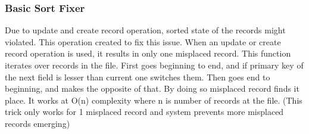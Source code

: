 \documentclass{article}
\begin{document}
\subsubsection{Basic Sort Fixer}
Due to update and create record operation, sorted state of the records might violated. This operation created to fix this issue. When an update or create record operation is used, it results in only one misplaced record. This function iterates over records in the file. First goes beginning to end, and if primary key of the next field is lesser than current one switches them. Then goes end to beginning, and makes the opposite of that. By doing so misplaced record finds it place. It works at O(n) complexity where n is number of records at the file. (This trick only works for 1 misplaced record and system prevents more misplaced records emerging)
\end{document}
